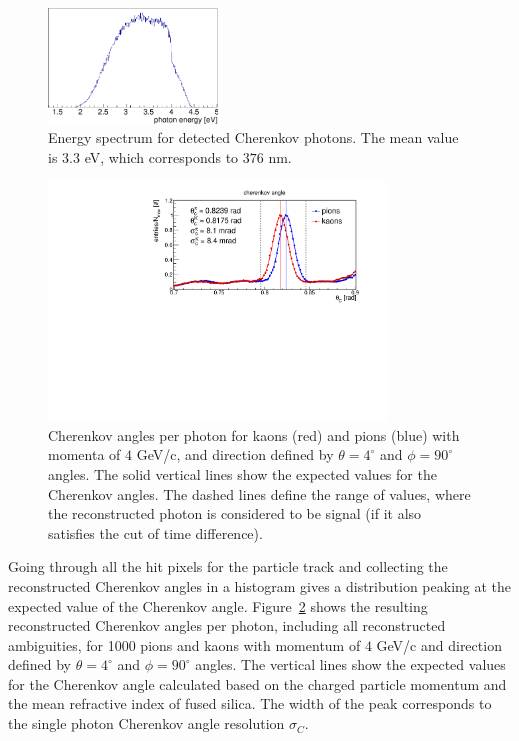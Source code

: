 \begin{figure}[!h]
\centering
\includegraphics[width=0.4\textwidth]{pics/lam.pdf}
\caption{\label{pic:lam}
Energy spectrum for detected Cherenkov photons. The mean value is $3.3$ eV, which corresponds to $376$ nm.
}
\end{figure}

\begin{figure}[!h]
\centering
\includegraphics[clip, trim=0cm 0cm 0cm 0.7cm, width=0.8\textwidth]{pics/hAngle.pdf}
\caption{\label{pic:spr}
Cherenkov angles per photon for kaons (red) and pions (blue) with momenta of $4$ GeV/c, and direction defined by $\theta = 4^{\circ}$ and $\phi = 90^{\circ}$ angles. The solid vertical lines show the expected values for the Cherenkov angles. The dashed lines define the range of values, where the reconstructed photon is considered to be signal (if it also satisfies the cut of time difference). 
}
\end{figure}

Going through all the hit pixels for the particle track and collecting the reconstructed Cherenkov angles in a histogram gives a distribution peaking at the expected value of the Cherenkov angle. Figure~\ref{pic:spr} shows the resulting reconstructed Cherenkov angles per photon, including all reconstructed ambiguities, for 1000 pions and kaons with momentum of $4$ GeV/c and direction defined by $\theta = 4^{\circ}$ and $\phi = 90^{\circ}$ angles. The vertical lines show the expected values for the Cherenkov angle calculated based on the charged particle momentum and the mean refractive index of fused silica. The width of the peak corresponds to the single photon Cherenkov angle resolution $\sigma_{C}$.

